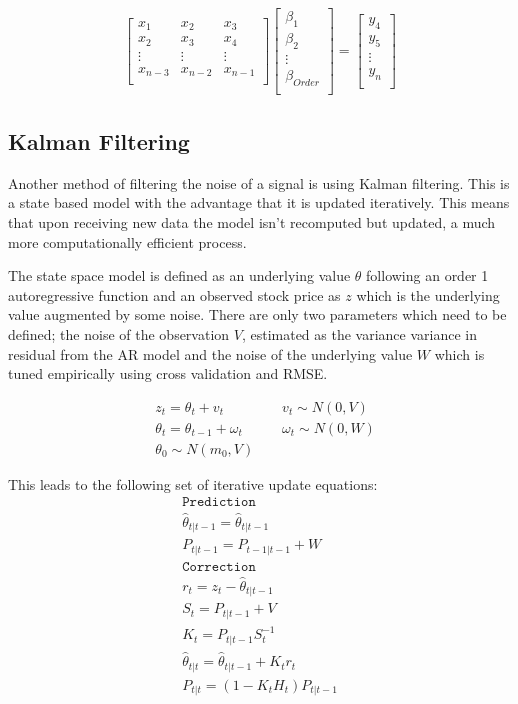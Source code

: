 \documentclass{sig-alternate-05-2015}
\begin{document}
\begin{align}
\begin{bmatrix}
  x_1 & x_2 & x_3 \\ 
  x_2 & x_3 & x_4 \\ 
  \vdots & \vdots & \vdots \\ 
  x_{n-3} & x_{n-2} & x_{n-1} \\
\end{bmatrix}
\begin{bmatrix}
  \beta_1 \\ 
  \beta_2 \\ 
  \vdots \\ 
  \beta_{Order} \\ 
\end{bmatrix}
=
\begin{bmatrix}
  y_4 \\ 
  y_5 \\ 
  \vdots \\ 
  y_n \\ 
\end{bmatrix}
\end{align}

\subsection{Kalman Filtering}
Another method of filtering the noise of a signal is using Kalman filtering. This is a state based model with the advantage that it is updated iteratively. This means that upon receiving new data the model isn't recomputed but updated, a much more computationally efficient process. 

The state space model is defined as an underlying value $\theta$ following an order 1 autoregressive function and an observed stock price as $z$ which is the underlying value augmented by some noise. There are only two parameters which need to be defined; the noise of the observation $V$, estimated as the variance variance in residual from the AR model and the noise of the underlying value $W$ which is tuned empirically using cross validation and RMSE. 

\begin{align}
&z_t = \theta_t + v_t \qquad &v_t \sim N(0, V) \\
&\theta_t = \theta_{t-1} + \omega_t \qquad &\omega_t \sim N(0, W) \\
&\theta_0 \sim N(m_0, V)
\end{align}

This leads to the following set of iterative update equations:
\begin{align*}
\mathtt{Prediction} \\
\hat{\theta}_{t|t-1} = \hat{\theta}_{t|t-1} \\
P_{t|t-1} = P_{t-1|t-1} + W \\
\mathtt{Correction} \\
r_t = z_t - \hat{\theta}_{t|t-1} \\
S_t = P_{t|t-1} + V \\
K_t = P_{t|t-1}S_t^{-1} \\
\hat{\theta}_{t|t} = \hat{\theta}_{t|t-1} + K_tr_t \\
P_{t|t} = (1 - K_tH_t)P_{t|t-1}
\end{align*}
\end{document}
